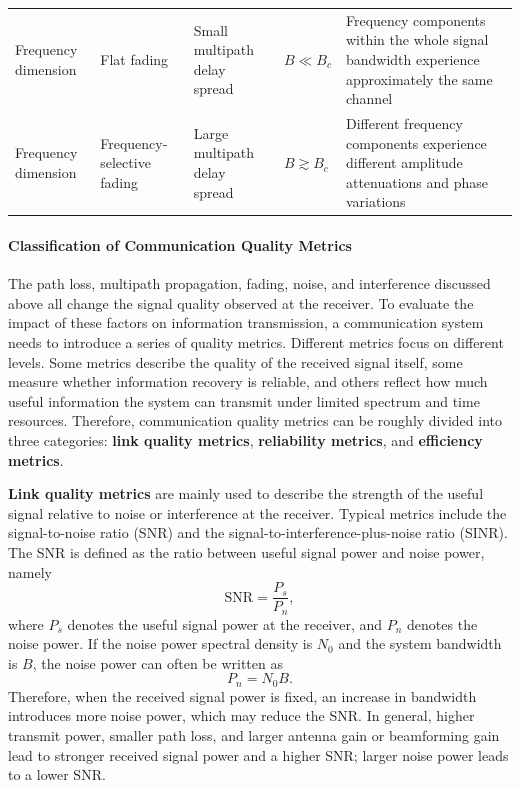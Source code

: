 \begin{table}[htbp]
\begin{tabularx}{\textwidth}{p{} p{} X X X}
        Frequency dimension
        &
        Flat fading
        &
        Small multipath delay spread
        &
        \(B \ll B_c\)
        &
        Frequency components within the whole signal bandwidth experience approximately the same channel
        \\

        Frequency dimension
        &
        Frequency-selective fading
        &
        Large multipath delay spread
        &
        \(B \gtrsim B_c\)
        &
        Different frequency components experience different amplitude attenuations and phase variations
        \\
        \hline
    \end{tabularx}
\end{table}


\paragraph{Classification of Communication Quality Metrics}

The path loss,
multipath propagation,
fading,
noise,
and interference discussed above all change the signal quality observed at the receiver.
To evaluate the impact of these factors on information transmission,
a communication system needs to introduce a series of quality metrics.
Different metrics focus on different levels.
Some metrics describe the quality of the received signal itself,
some measure whether information recovery is reliable,
and others reflect how much useful information the system can transmit under limited spectrum and time resources.
Therefore,
communication quality metrics can be roughly divided into three categories:
\textbf{link quality metrics},
\textbf{reliability metrics},
and \textbf{efficiency metrics}.

\textbf{Link quality metrics} are mainly used to describe the strength of the useful signal
relative to noise or interference at the receiver.
Typical metrics include the signal-to-noise ratio (SNR)
and the signal-to-interference-plus-noise ratio (SINR).
The SNR is defined as the ratio between useful signal power and noise power,
namely
\begin{equation}
    \mathrm{SNR}
    =
    \frac{P_s}{P_n},
    \label{eq:snr-definition}
\end{equation}
where
\(P_s\) denotes the useful signal power at the receiver,
and \(P_n\) denotes the noise power.
If the noise power spectral density is \(N_0\)
and the system bandwidth is \(B\),
the noise power can often be written as
\begin{equation}
    P_n
    =
    N_0 B.
    \label{eq:noise-power-bandwidth}
\end{equation}
Therefore,
when the received signal power is fixed,
an increase in bandwidth introduces more noise power,
which may reduce the SNR.
In general,
higher transmit power,
smaller path loss,
and larger antenna gain or beamforming gain lead to stronger received signal power
and a higher SNR;
larger noise power leads to a lower SNR.


